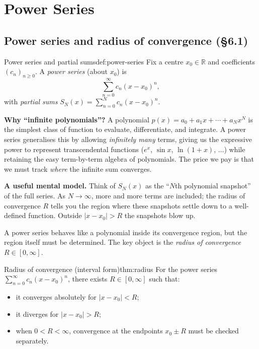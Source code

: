 \section{Power Series}

\subsection{Power series and radius of convergence (\S6.1)}

\begin{definition}{Power series and partial sums}{def:power-series}
Fix a centre $x_0\in\mathbb{R}$ and coefficients $(c_n)_{n\ge 0}$. A \emph{power series} (about $x_0$) is
\[
\sum_{n=0}^{\infty} c_n (x-x_0)^n,
\]
with \emph{partial sums} $S_N(x)=\sum_{n=0}^{N} c_n (x-x_0)^n$.
\end{definition}

\noindent\textbf{Why ``infinite polynomials''?}
A polynomial $p(x)=a_0+a_1 x+\cdots+a_N x^N$ is the simplest class of function to evaluate, differentiate, and integrate.
A power series generalises this by allowing \emph{infinitely many} terms, giving us the expressive power to represent
transcendental functions ($e^x$, $\sin x$, $\ln(1+x)$, $\dots$) while retaining the easy term-by-term algebra of polynomials.
The price we pay is that we must track \emph{where} the infinite sum converges.

\noindent\textbf{A useful mental model.}
Think of $S_N(x)$ as the ``$N$th polynomial snapshot'' of the full series.
As $N\to\infty$, more and more terms are included; the radius of convergence $R$ tells you the region where these snapshots settle down to a well-defined function.
Outside $|x-x_0|>R$ the snapshots blow up.

A power series behaves like a polynomial inside its convergence region, but the region itself must be determined.
The key object is the \emph{radius of convergence} $R\in[0,\infty]$.

\begin{theorem}{Radius of convergence (interval form)}{thm:radius}
For the power series $\sum_{n=0}^{\infty} c_n (x-x_0)^n$, there exists $R\in[0,\infty]$ such that:
\begin{itemize}[leftmargin=*]
\item it converges absolutely for $|x-x_0|<R$;
\item it diverges for $|x-x_0|>R$;
\item when $0<R<\infty$, convergence at the endpoints $x_0\pm R$ must be checked separately.
\end{itemize}
\end{theorem}

